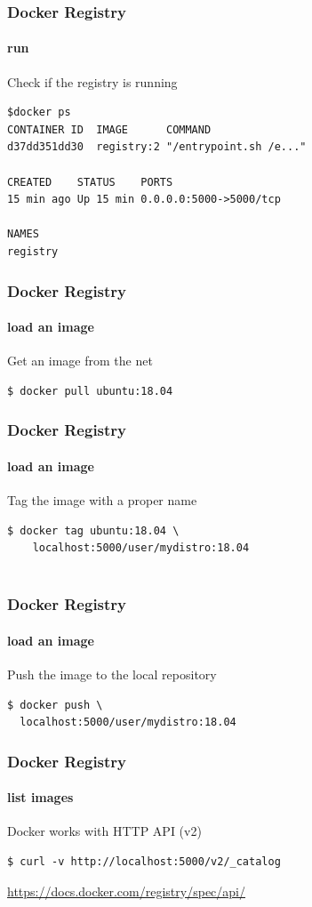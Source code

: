 \begin{frame}[fragile]
\frametitle{Docker Registry}
\framesubtitle{run}

Check if the registry is running

\begin{lstlisting}
$docker ps
CONTAINER ID  IMAGE      COMMAND
d37dd351dd30  registry:2 "/entrypoint.sh /e..."

CREATED    STATUS    PORTS                  
15 min ago Up 15 min 0.0.0.0:5000->5000/tcp 

NAMES
registry
\end{lstlisting}
\end{frame}

\begin{frame}[fragile]
\frametitle{Docker Registry}
\framesubtitle{load an image}

Get an image from the net

\begin{lstlisting}
$ docker pull ubuntu:18.04
\end{lstlisting}
\end{frame}

\begin{frame}[fragile]
\frametitle{Docker Registry}
\framesubtitle{load an image}

Tag the image with a proper name
\begin{lstlisting}
$ docker tag ubuntu:18.04 \
    localhost:5000/user/mydistro:18.04
    
\end{lstlisting}
\end{frame}

\begin{frame}[fragile]
\frametitle{Docker Registry}
\framesubtitle{load an image}

Push the image to the local repository

\begin{lstlisting}
$ docker push \
  localhost:5000/user/mydistro:18.04
\end{lstlisting}
\end{frame}

\begin{frame}[fragile]
\frametitle{Docker Registry}
\framesubtitle{list images}

Docker works with HTTP API (v2)

\begin{lstlisting}
$ curl -v http://localhost:5000/v2/_catalog
\end{lstlisting}

\url{https://docs.docker.com/registry/spec/api/}

\end{frame}

